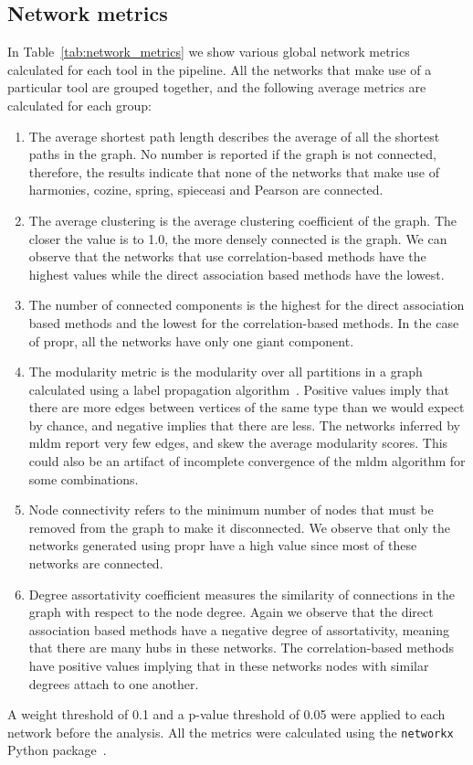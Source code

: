 \documentclass[letterpaper,12pt]{article}
\begin{document}
  \subsection*{Network metrics}

  In Table~\ref{tab:network_metrics} we show various global network metrics calculated for each tool in the pipeline.
  All the networks that make use of a particular tool are grouped together, and the following average metrics are calculated for each group:
  \begin{enumerate}
    \item The average shortest path length describes the average of all the shortest paths in the graph. No number is reported if the graph is not connected, therefore, the results indicate that none of the networks that make use of \acs{harmonies}, \acs{cozine}, \acs{spring}, \acs{spieceasi} and Pearson are connected.
    \item The average clustering is the average clustering coefficient of the graph. The closer the value is to 1.0, the more densely connected is the graph. We can observe that the networks that use correlation-based methods have the highest values while the direct association based methods have the lowest.
    \item The number of connected components is the highest for the direct association based methods and the lowest for the correlation-based methods. In the case of propr, all the networks have only one giant component.
    \item The modularity metric is the modularity over all partitions in a graph calculated using a label propagation algorithm~\cite{cordascoCommunityDetectionSemisynchronous2010}. Positive values imply that there are more edges between vertices of the same type than we would expect by chance, and negative implies that there are less. The networks inferred by \acs{mldm} report very few edges, and skew the average modularity scores. This could also be an artifact of incomplete convergence of the \acs{mldm} algorithm for some combinations.
    \item Node connectivity refers to the minimum number of nodes that must be removed from the graph to make it disconnected. We observe that only the networks generated using propr have a high value since most of these networks are connected.
    \item Degree assortativity coefficient measures the similarity of connections in the graph with respect to the node degree. Again we observe that the direct association based methods have a negative degree of assortativity, meaning that there are many hubs in these networks. The correlation-based methods have positive values implying that in these networks nodes with similar degrees attach to one another.
  \end{enumerate}
  A weight threshold of 0.1 and a p-value threshold of 0.05 were applied to each network before the analysis.
  All the metrics were calculated using the \texttt{networkx} Python package~\cite{hagbergExploringNetworkStructure2008}.
\end{document}
